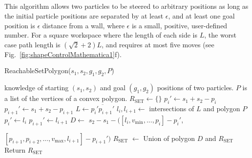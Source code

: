 \subsection{}
 This algorithm allows two particles to be steered to arbitrary positions as long as the initial particle positions are separated by at least $\epsilon$, and at least one goal position is $\epsilon$ distance from a wall, where $\epsilon$ is a small, positive, user-defined number. 
For a square workspace where the length of each side is $L$, the worst case path length is $(\sqrt{2}+2)L$, and requires at most five moves (see Fig.~\ref{fig:shapeControlMathematica1}f).



% 
 \begin{algorithm}[htb]
\caption{ { \sc ReachableSetPolygon}($s_1,s_2,g_1,g_2, P$)}\label{alg:polygonReachbale}
\begin{algorithmic}[1]
\Require knowledge of starting $(s_1,s_2)$ and goal $(g_1,g_2)$ positions of  two particles. 
$P$ is a list of the vertices of a convex polygon. %
\State $R_{\textrm{SET}}\gets \{\}$
\State $p_{i}' \gets s_1 + s_2 - p_i$
\State $p_{i+1}' \gets s_1 + s_2 - p_{i+1}$
\State $L \gets \overline{ p_i' p_{i+1}'}$ 
\State $l_i, l_{i+1} \gets $ intersections of $L$ and polygon $P$
\State $p_{i}' \gets l_i$
\EndIf
{}
\State $p_{i+1}' \gets l_{i+1}$
\EndIf
\State $D \gets$ $s_2 - s_1 -([l_i, v_{\textrm{min}}, ..., p_i ] -p_i' $,

$[p_{i+1} , p_{i+2}, ... , v_{\textrm{max}}, l_{i+1}] - p_{i+1}')$
\State $R_{\textrm{SET}}$ $\gets$ Union of polygon $D$ and $R_{\textrm{SET}}$
\EndFor
\State Return $R_{\textrm{SET}}$
\end{algorithmic}
\end{algorithm}



